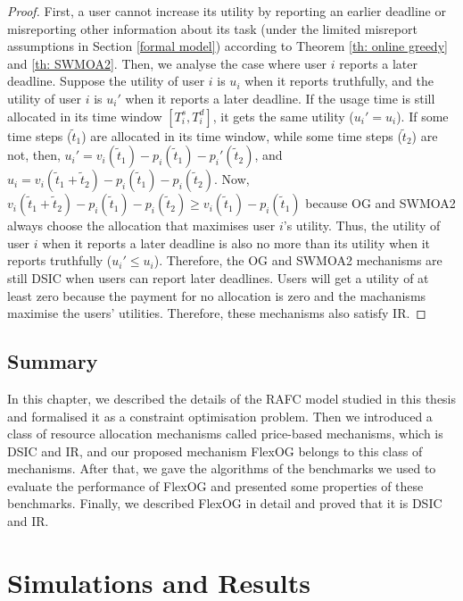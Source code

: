 \documentclass[11pt]{phdthesis}
\begin{document}
\begin{proof}
  First, a user cannot increase its utility by reporting an earlier deadline or misreporting other information about its task (under the limited misreport assumptions in Section \ref{formal model}) according to Theorem \ref{th: online greedy} and \ref{th: SWMOA2}. Then, we analyse the case where user $ i $ reports a later deadline. Suppose the utility of user $ i $ is $ u_i $ when it reports truthfully, and the utility of user $ i $ is $ u_i' $ when it reports a later deadline. If the usage time is still allocated in its time window $ [T_i^s, T_i^d] $, it gets the same utility ($ u_i' = u_i $). If some time steps ($ \tilde{t}_1 $) are allocated in its time window, while some time steps ($ \tilde{t}_2 $) are not, then, $ u_i' = v_i(\tilde{t}_1) - p_i(\tilde{t}_1) -  p_i'(\tilde{t}_2)$, and $ u_i = v_i(\tilde{t}_1 + \tilde{t}_2) - p_i(\tilde{t}_1) -  p_i(\tilde{t}_2) $. Now, $ v_i(\tilde{t}_1 + \tilde{t}_2) - p_i(\tilde{t}_1) - p_i(\tilde{t}_2) \geq v_i(\tilde{t}_1) - p_i(\tilde{t}_1) $ because OG and SWMOA2 always choose the allocation that maximises user $ i $'s utility. Thus, the utility of user $ i $ when it reports a later deadline is also no more than its utility when it reports truthfully ($ u_i' \leq u_i $). Therefore, the OG and SWMOA2 mechanisms are still DSIC when users can report later deadlines. Users will get a utility of at least zero because the payment for no allocation is zero and the machanisms maximise the users' utilities. Therefore, these mechanisms also satisfy IR.
\end{proof}




\section{Summary} \label{mechansims summary}

In this chapter, we described the details of the RAFC model studied in this thesis and formalised it as a constraint optimisation problem. Then we introduced a class of resource allocation mechanisms called price-based mechanisms, which is DSIC and IR, and our proposed mechanism FlexOG belongs to this class of mechanisms. After that, we gave the algorithms of the benchmarks we used to evaluate the performance of FlexOG and presented some properties of these benchmarks. Finally, we described FlexOG in detail and proved that it is DSIC and IR. 



\chapter{Simulations and Results} \label{simulation and results}
\end{document}

